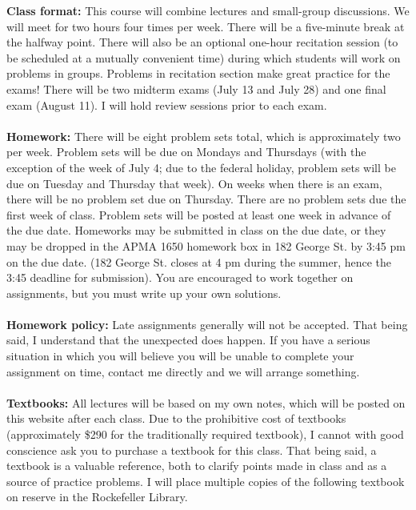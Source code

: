 \documentclass[11pt]{article}
\begin{document}
\textbf {Class format:} This course will combine lectures and small-group discussions. We will meet for two hours four times per week. There will be a five-minute break at the halfway point. There will also be an optional one-hour recitation session (to be scheduled at a mutually convenient time) during which students will work on problems in groups. Problems in recitation section make great practice for the exams! There will be two midterm exams (July 13 and July 28) and one final exam (August 11). I will hold review sessions prior to each exam.\\\\
\textbf {Homework: }There will be eight problem sets total, which is approximately two per week. Problem sets will be due on Mondays and Thursdays (with the exception of the week of July 4; due to the federal holiday, problem sets will be due on Tuesday and Thursday that week). On weeks when there is an exam, there will be no problem set due on Thursday. There are no problem sets due the first week of class. Problem sets will be posted at least one week in advance of the due date. Homeworks may be submitted in class on the due date, or they may be dropped in the APMA 1650 homework box in 182 George St. by 3:45 pm on the due date. (182 George St. closes at 4 pm during the summer, hence the 3:45 deadline for submission). You are encouraged to work together on assignments, but you must write up your own solutions.\\\\
\textbf{Homework policy: }Late assignments generally will not be accepted. That being said, I understand that the unexpected does happen. If you have a serious situation in which you will believe you will be unable to complete your assignment on time, contact me directly and we will arrange something.\\\\
\textbf {\large Textbooks:} All lectures will be based on my own notes, which will be posted on this website after each class. Due to the prohibitive cost of textbooks (approximately \$290 for the traditionally required textbook), I cannot with good conscience ask you to purchase a textbook for this class. That being said, a textbook is a valuable reference, both to clarify points made in class and as a source of practice problems. I will place multiple copies of the following textbook on reserve in the Rockefeller Library.
\end{document}
